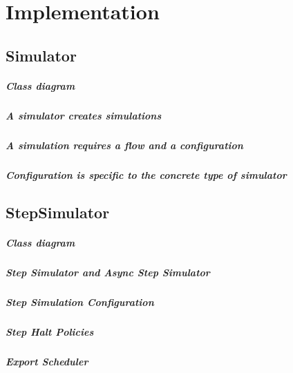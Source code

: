 
\chapter{Implementation}
\label{chapter:implementation}

\section{Simulator}
\paragraph{Class diagram}
\paragraph{A simulator creates simulations}
\paragraph{A simulation requires a flow and a configuration}
\paragraph{Configuration is specific to the concrete type of simulator}

\section{StepSimulator}
\paragraph{Class diagram}
\paragraph{Step Simulator and Async Step Simulator}
\paragraph{Step Simulation Configuration}
\paragraph{Step Halt Policies}
\paragraph{Export Scheduler}


